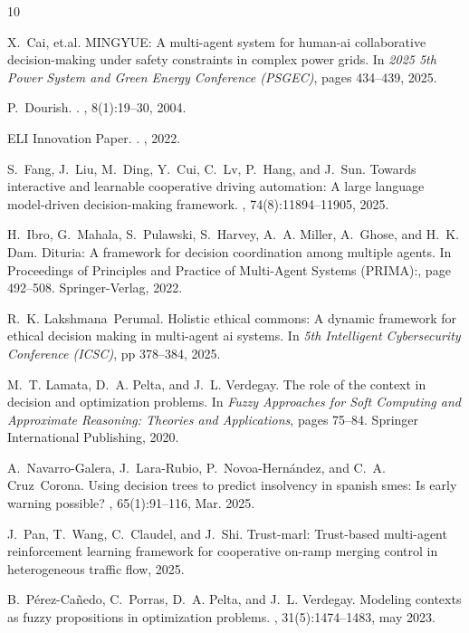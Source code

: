 \documentclass[letterpaper, 10 pt,conference]{IEEEconf}
\begin{document}
%
%
\begin{thebibliography}{10}

X.~Cai, et.al.
\newblock MINGYUE: A multi-agent system for human-ai collaborative decision-making under safety constraints in complex power grids.
\newblock In {\em 2025 5th Power System and Green Energy Conference (PSGEC)}, pages 434--439, 2025.

P.~Dourish.
.
, 8(1):19--30, 2004.

{ELI Innovation Paper}.
.
, 2022.

S.~Fang, J.~Liu, M.~Ding, Y.~Cui, C.~Lv, P.~Hang, and J.~Sun.
\newblock Towards interactive and learnable cooperative driving automation: A large language model-driven decision-making framework.
, 74(8):11894--11905, 2025.

H.~Ibro, G.~Mahala, S.~Pulawski, S.~Harvey, A.~A. Miller, A.~Ghose, and H.~K. Dam.
\newblock Dituria: A framework for decision coordination among multiple agents.
\newblock In {Proceedings of Principles and Practice of Multi-Agent Systems (PRIMA):}, page 492–508. Springer-Verlag, 2022.


R.~K. Lakshmana~Perumal.
\newblock Holistic ethical commons: A dynamic framework for ethical decision making in multi-agent ai systems.
\newblock In {\em 5th Intelligent Cybersecurity Conference (ICSC)}, pp 378--384, 2025.

M.~T. Lamata, D.~A. Pelta, and J.~L. Verdegay.
\newblock The role of the context in decision and optimization problems.
\newblock In {\em Fuzzy Approaches for Soft Computing and Approximate Reasoning: Theories and Applications}, pages 75--84. Springer International Publishing, 2020.

A.~Navarro-Galera, J.~Lara-Rubio, P.~Novoa-Hernández, and C.~A. Cruz~Corona.
\newblock Using decision trees to predict insolvency in spanish smes: Is early warning possible?
, 65(1):91–116, Mar. 2025.

J.~Pan, T.~Wang, C.~Claudel, and J.~Shi.
\newblock Trust-marl: Trust-based multi-agent reinforcement learning framework for cooperative on-ramp merging control in heterogeneous traffic flow, 2025.

B.~P{\'{e}}rez-Ca{\~{n}}edo, C.~Porras, D.~A. Pelta, and J.~L. Verdegay.
\newblock Modeling contexts as fuzzy propositions in optimization problems.
, 31(5):1474--1483, may 2023.

\end{thebibliography}
\end{document}
